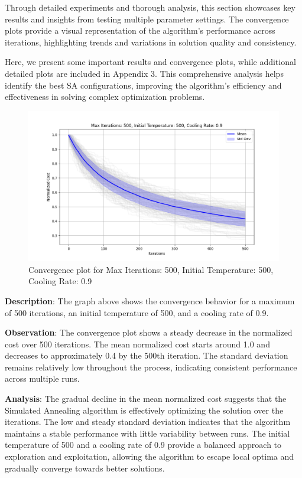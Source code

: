 \documentclass[
]{article}
\begin{document}
    Through detailed experiments and thorough analysis, this section showcases key results and insights from testing multiple parameter settings.
    The convergence plots provide a visual representation of the algorithm’s performance across iterations, highlighting trends and variations in solution quality and consistency.

    Here, we present some important results and convergence plots, while additional detailed plots are included in Appendix 3.
    This comprehensive analysis helps identify the best SA configurations, improving the algorithm’s efficiency and effectiveness in solving complex optimization problems.

    \begin{figure}[H]
        \centering
        \includegraphics[width=\textwidth]{simulated_annealing/max_iter_500_init_temp_500_cooling_rate_0.9}
        \caption{Convergence plot for Max Iterations: 500, Initial Temperature: 500, Cooling Rate: 0.9}
        \label{fig:sa_500_500_0.9}
    \end{figure}

    \textbf{Description}: The graph above shows the convergence behavior for a maximum of 500 iterations, an initial temperature of 500, and a cooling rate of 0.9.

    \textbf{Observation}: The convergence plot shows a steady decrease in the normalized cost over 500 iterations. The mean normalized cost starts around 1.0 and decreases to approximately 0.4 by the 500th iteration. The standard deviation remains relatively low throughout the process, indicating consistent performance across multiple runs.

    \textbf{Analysis}: The gradual decline in the mean normalized cost suggests that the Simulated Annealing algorithm is effectively optimizing the solution over the iterations. The low and steady standard deviation indicates that the algorithm maintains a stable performance with little variability between runs. The initial temperature of 500 and a cooling rate of 0.9 provide a balanced approach to exploration and exploitation, allowing the algorithm to escape local optima and gradually converge towards better solutions.
\end{document}
